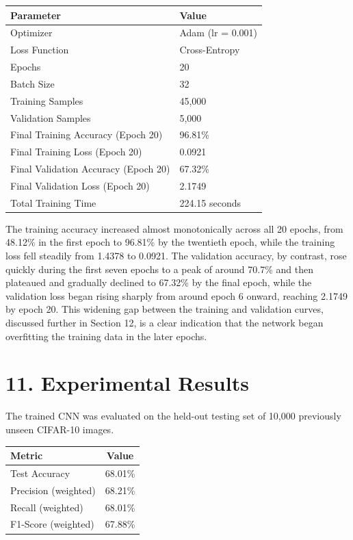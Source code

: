 \documentclass[11pt,a4paper]{article}
\begin{document}
\begin{center}
\begin{tabular}{|p{6cm}|p{6cm}|}
\hline
\textbf{Parameter} & \textbf{Value}\\
\hline
Optimizer & Adam (lr = 0.001)\\
\hline
Loss Function & Cross-Entropy\\
\hline
Epochs & 20\\
\hline
Batch Size & 32\\
\hline
Training Samples & 45{,}000\\
\hline
Validation Samples & 5{,}000\\
\hline
Final Training Accuracy (Epoch 20) & 96.81\%\\
\hline
Final Training Loss (Epoch 20) & 0.0921\\
\hline
Final Validation Accuracy (Epoch 20) & 67.32\%\\
\hline
Final Validation Loss (Epoch 20) & 2.1749\\
\hline
Total Training Time & 224.15 seconds\\
\hline
\end{tabular}
\end{center}

\vspace{0.15cm}

The training accuracy increased almost monotonically across all 20 epochs, from 48.12\% in the first epoch to 96.81\% by the twentieth epoch, while the training loss fell steadily from 1.4378 to 0.0921. The validation accuracy, by contrast, rose quickly during the first seven epochs to a peak of around 70.7\% and then plateaued and gradually declined to 67.32\% by the final epoch, while the validation loss began rising sharply from around epoch 6 onward, reaching 2.1749 by epoch 20. This widening gap between the training and validation curves, discussed further in Section 12, is a clear indication that the network began overfitting the training data in the later epochs.

\section*{11. Experimental Results}

The trained CNN was evaluated on the held-out testing set of 10{,}000 previously unseen CIFAR-10 images.

\begin{center}
\begin{tabular}{|p{6cm}|c|}
\hline
\textbf{Metric} & \textbf{Value}\\
\hline
Test Accuracy & 68.01\%\\
\hline
Precision (weighted) & 68.21\%\\
\hline
Recall (weighted) & 68.01\%\\
\hline
F1-Score (weighted) & 67.88\%\\
\hline
\end{tabular}
\end{center}
\end{document}
